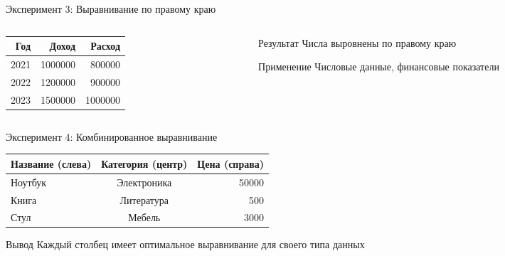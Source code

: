 \documentclass[aspectratio=169]{beamer}
\begin{document}
\begin{frame}{Эксперимент 3: Выравнивание по правому краю}
    \begin{columns}[T]
        \begin{column}{0.6\textwidth}
            \begin{center}
            \begin{tabular}{|r|r|r|}
            \hline
            \textbf{Год} & \textbf{Доход} & \textbf{Расход} \\
            \hline
            2021 & 1000000 & 800000 \\
            2022 & 1200000 & 900000 \\
            2023 & 1500000 & 1000000 \\
            \hline
            \end{tabular}
            \end{center}
        \end{column}
        
        \begin{column}{0.4\textwidth}
            \begin{block}{Результат}
                Числа выровнены по правому краю
            \end{block}
            
            \begin{alertblock}{Применение}
                Числовые данные, финансовые показатели
            \end{alertblock}
        \end{column}
    \end{columns}
\end{frame}

\begin{frame}{Эксперимент 4: Комбинированное выравнивание}
    \begin{center}
    \begin{tabular}{|l|c|r|}
    \hline
    \textbf{Название (слева)} & \textbf{Категория (центр)} & \textbf{Цена (справа)} \\
    \hline
    Ноутбук & Электроника & 50000 \\
    Книга & Литература & 500 \\
    Стул & Мебель & 3000 \\
    \hline
    \end{tabular}
    \end{center}
    
    \vspace{0.5cm}
    
    \begin{block}{Вывод}
        Каждый столбец имеет оптимальное выравнивание для своего типа данных
    \end{block}
\end{frame}
\end{document}
